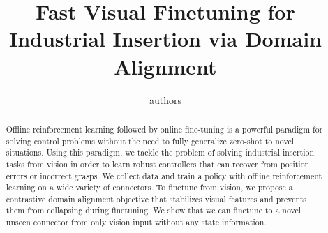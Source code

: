 \documentclass[letterpaper, 10 pt, conference, final]{ieeeconf}   %
\title{\LARGE \bf Fast Visual Finetuning for Industrial Insertion via Domain Alignment}
\author{authors}
\newcommand\blfootnote[1]{%
  \begingroup
  \renewcommand\thefootnote{}\footnote{#1}%
  \addtocounter{footnote}{-1}%
  \endgroup
}
\begin{document}




\vspace{-10pt}
\maketitle


\begin{abstract}
Offline reinforcement learning followed by online fine-tuning is a powerful paradigm for solving control problems without the need to fully generalize zero-shot to novel situations.
Using this paradigm, we tackle the problem of solving industrial insertion tasks from vision in order to learn robust controllers that can recover from position errors or incorrect grasps.
We collect data and train a policy with offline reinforcement learning on a wide variety of connectors.
To finetune from vision, we propose a contrastive domain alignment objective that stabilizes visual features and prevents them from collapsing during finetuning.
We show that we can finetune to a novel unseen connector from only vision input without any state information.
\end{abstract}
\end{document}

